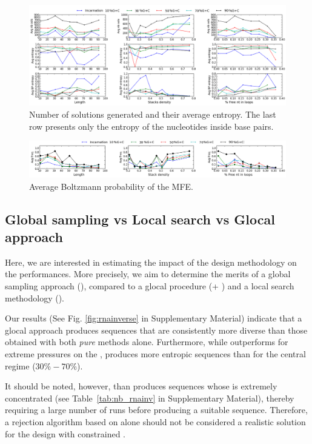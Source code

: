 \begin{figure}[ht!]
	\centering
	\includegraphics[width=\textwidth]{Figures/nb_sols_entropy.png}
	\caption{Number of solutions generated and their average entropy. 
	The last row presents only the entropy of the nucleotides inside base 
	pairs.}
	\label{fig:nb_sols_entropy}
\end{figure}



\begin{figure}[ht!]
	\centering
	\includegraphics[width=\textwidth]{Figures/freq.png}
	\caption{Average Boltzmann probability of the MFE.}
	\label{fig:freq}
\end{figure}

\subsection{Global sampling vs Local search vs Glocal approach}


Here, we are interested in estimating the impact of the design methodology on the performances. More precisely, we aim to determine the merits of a global sampling approach (\ourprog), compared to a glocal procedure (\ourprog + \RNAinverse) and a local search methodology (\RNAinverse). 

Our results (See Fig. \ref{fig:rnainverse} in Supplementary Material) indicate that a glocal approach produces sequences that are consistently more diverse than those obtained with both {\em pure} methods alone. Furthermore, while \ourprog outperforms \RNAinverse for extreme pressures on the \GCContent, \RNAinverse produces more entropic sequences than \ourprog for the central \GCContent regime ($30\%-70\%$). 

It should be noted, however, than \RNAinverse produces sequences whose \GCContent is extremely concentrated (see Table~\ref{tab:nb_rnainv} in Supplementary Material), thereby requiring a large number of runs before producing a suitable \GCContent sequence. Therefore, a rejection algorithm based on \RNAinverse alone should not be considered a realistic solution for the design with constrained \GCContent. 

